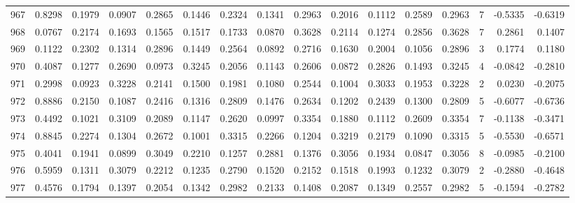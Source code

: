 \begin{tabular}{lrrrrrrrrrrrrrrr}
967 &      0.8298 &  0.1979 &  0.0907 &  0.2865 &  0.1446 &  0.2324 &  0.1341 &  0.2963 &  0.2016 &  0.1112 &   0.2589 &     0.2963 &      7 &                   -0.5335 &                    -0.6319 \\
968 &      0.0767 &  0.2174 &  0.1693 &  0.1565 &  0.1517 &  0.1733 &  0.0870 &  0.3628 &  0.2114 &  0.1274 &   0.2856 &     0.3628 &      7 &                    0.2861 &                     0.1407 \\
969 &      0.1122 &  0.2302 &  0.1314 &  0.2896 &  0.1449 &  0.2564 &  0.0892 &  0.2716 &  0.1630 &  0.2004 &   0.1056 &     0.2896 &      3 &                    0.1774 &                     0.1180 \\
970 &      0.4087 &  0.1277 &  0.2690 &  0.0973 &  0.3245 &  0.2056 &  0.1143 &  0.2606 &  0.0872 &  0.2826 &   0.1493 &     0.3245 &      4 &                   -0.0842 &                    -0.2810 \\
971 &      0.2998 &  0.0923 &  0.3228 &  0.2141 &  0.1500 &  0.1981 &  0.1080 &  0.2544 &  0.1004 &  0.3033 &   0.1953 &     0.3228 &      2 &                    0.0230 &                    -0.2075 \\
972 &      0.8886 &  0.2150 &  0.1087 &  0.2416 &  0.1316 &  0.2809 &  0.1476 &  0.2634 &  0.1202 &  0.2439 &   0.1300 &     0.2809 &      5 &                   -0.6077 &                    -0.6736 \\
973 &      0.4492 &  0.1021 &  0.3109 &  0.2089 &  0.1147 &  0.2620 &  0.0997 &  0.3354 &  0.1880 &  0.1112 &   0.2609 &     0.3354 &      7 &                   -0.1138 &                    -0.3471 \\
974 &      0.8845 &  0.2274 &  0.1304 &  0.2672 &  0.1001 &  0.3315 &  0.2266 &  0.1204 &  0.3219 &  0.2179 &   0.1090 &     0.3315 &      5 &                   -0.5530 &                    -0.6571 \\
975 &      0.4041 &  0.1941 &  0.0899 &  0.3049 &  0.2210 &  0.1257 &  0.2881 &  0.1376 &  0.3056 &  0.1934 &   0.0847 &     0.3056 &      8 &                   -0.0985 &                    -0.2100 \\
976 &      0.5959 &  0.1311 &  0.3079 &  0.2212 &  0.1235 &  0.2790 &  0.1520 &  0.2152 &  0.1518 &  0.1993 &   0.1232 &     0.3079 &      2 &                   -0.2880 &                    -0.4648 \\
977 &      0.4576 &  0.1794 &  0.1397 &  0.2054 &  0.1342 &  0.2982 &  0.2133 &  0.1408 &  0.2087 &  0.1349 &   0.2557 &     0.2982 &      5 &                   -0.1594 &                    -0.2782 \\

\end{tabular}
